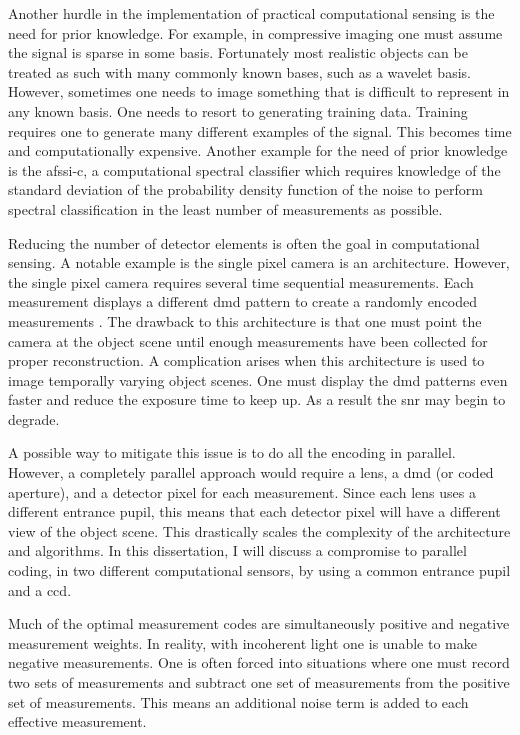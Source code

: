 Another hurdle in the implementation of practical computational sensing is the need for prior knowledge. For example, in \gls{compressive imaging} one must assume the signal is sparse in some basis. Fortunately most realistic objects can be treated as such with many commonly known bases, such as a wavelet basis. However, sometimes one needs to image something that is difficult to represent in any known basis. One needs to resort to generating training data.  Training requires one to generate many different examples of the signal. This becomes time and computationally expensive. Another example for the need of prior knowledge is the \gls{afssi-c}, a computational spectral classifier which requires knowledge of the standard deviation of the probability density function of the noise to perform spectral classification in the least number of measurements as possible.

Reducing the number of detector elements is often the goal in computational sensing. A notable example is the single pixel camera is an architecture. However, the single pixel camera requires several time sequential measurements. Each measurement displays a different \gls{dmd} pattern to create a randomly encoded measurements \cite{duarte2008single}. The drawback to this architecture is that one must point the camera at the object scene until enough measurements have been collected for proper reconstruction. A complication arises when this architecture is used to image temporally varying object scenes. One must display the \gls{dmd} patterns even faster and reduce the exposure time to keep up. As a result the \gls{snr} may begin to degrade. 

A possible way to mitigate this issue is to do all the encoding in parallel. However, a completely parallel approach would require a lens, a \gls{dmd} (or coded aperture), and a detector pixel for each measurement. Since each lens uses a different entrance pupil, this means that each detector pixel will have a different view of the object scene. This drastically scales the complexity of the architecture and algorithms. In this dissertation, I will discuss a compromise to parallel coding, in two different computational sensors, by using a common entrance pupil and a \gls{ccd}.

Much of the optimal measurement codes are simultaneously positive and negative measurement weights. In reality, with incoherent light one is unable to make negative measurements. One is often forced into situations where one must record two sets of measurements and subtract one set of measurements from the positive set of measurements. This means an additional noise term is added to each effective measurement. 

